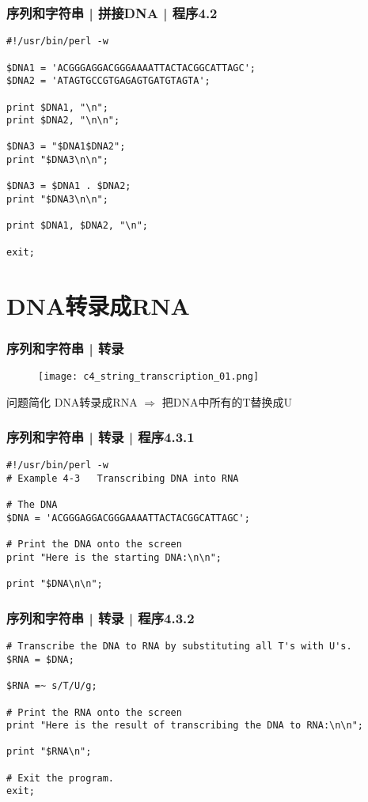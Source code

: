 \begin{frame}[fragile]
  \frametitle{序列和字符串 | 拼接DNA | \alert{程序4.2}}
\begin{lstlisting}[basicstyle=\small\tt]
#!/usr/bin/perl -w

$DNA1 = 'ACGGGAGGACGGGAAAATTACTACGGCATTAGC';
$DNA2 = 'ATAGTGCCGTGAGAGTGATGTAGTA';

print $DNA1, "\n";
print $DNA2, "\n\n";

$DNA3 = "$DNA1$DNA2";
print "$DNA3\n\n";

$DNA3 = $DNA1 . $DNA2;
print "$DNA3\n\n";

print $DNA1, $DNA2, "\n";

exit;
\end{lstlisting}
\end{frame}

\section{DNA转录成RNA}
\begin{frame}
  \frametitle{序列和字符串 | 转录}
  \begin{figure}
    \centering
    \texttt{[image: c4\_string\_transcription\_01.png]}
  \end{figure}
  \pause
  \begin{block}{问题简化}
    DNA转录成RNA $\Longrightarrow$ 把DNA中所有的T替换成U
  \end{block}
\end{frame}

\begin{frame}[fragile,label=exam4.3.1]
  \frametitle{序列和字符串 | 转录 | 程序4.3.1}
\begin{lstlisting}
#!/usr/bin/perl -w
# Example 4-3   Transcribing DNA into RNA

# The DNA
$DNA = 'ACGGGAGGACGGGAAAATTACTACGGCATTAGC';

# Print the DNA onto the screen
print "Here is the starting DNA:\n\n";

print "$DNA\n\n";
\end{lstlisting}
\end{frame}

\begin{frame}[fragile,label=exam4.3.2]
  \frametitle{序列和字符串 | 转录 | 程序4.3.2}
\begin{lstlisting}[firstnumber=12]
# Transcribe the DNA to RNA by substituting all T's with U's.
$RNA = $DNA;

$RNA =~ s/T/U/g;

# Print the RNA onto the screen
print "Here is the result of transcribing the DNA to RNA:\n\n";

print "$RNA\n";

# Exit the program.
exit;
\end{lstlisting}
\end{frame}

